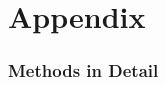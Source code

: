 \documentclass{article}
\begin{document}
\part*{Appendix}
\tableofcontents

\section{Methods in Detail}


\end{document}
